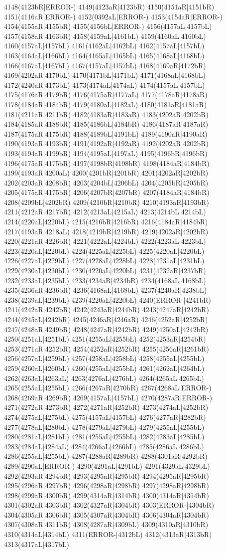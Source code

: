 4148(4123bR|ERROR-) 4149(4123aR|4123bR) 4150(4151aR|4151bR) 4151(4116aR|ERROR-) 4152(0392aL|ERROR-) 4153(4154aR|ERROR-) 4154(4155aR|4155bR) 4155(4156bL|ERROR-) 4156(4157aL|4157bL) 4157(4158aR|4163bR) 4158(4159aL|4161bL) 4159(4160aL|4160bL) 4160(4157aL|4157bL) 4161(4162aL|4162bL) 4162(4157aL|4157bL) 4163(4164aL|4166bL) 4164(4165aL|4165bL) 4165(4168aL|4168bL) 4166(4167aL|4167bL) 4167(4157aL|4157bL) 4168(4169aR|4172bR) 4169(4202aR|4170bL) 4170(4171bL|4171bL) 4171(4168aL|4168bL) 4172(4240aR|4173bL) 4173(4174aL|4174aL) 4174(4157aL|4157bL) 4175(4176aR|4179bR) 4176(4175aR|4177aL) 4177(4178aR|4178aR) 4178(4184aR|4184bR) 4179(4180aL|4182aL) 4180(4181aR|4181aR) 4181(4211aR|4211bR) 4182(4183aR|4183aR) 4183(4202aR|4202bR) 4184(4185aR|4188bR) 4185(4186bL|4184bR) 4186(4187aR|4187aR) 4187(4175aR|4175bR) 4188(4189bL|4191bL) 4189(4190aR|4190aR) 4190(4193aR|4193bR) 4191(4192aR|4192aR) 4192(4202aR|4202bR) 4193(4194aR|4199bR) 4194(4195aL|4197aL) 4195(4196bR|4196bR) 4196(4175aR|4175bR) 4197(4198bR|4198bR) 4198(4184aR|4184bR) 4199(4193aR|4200aL) 4200(4201bR|4201bR) 4201(4202aR|4202bR) 4202(4203aR|4208bR) 4203(4204bL|4206bL) 4204(4205bR|4205bR) 4205(4175aR|4175bR) 4206(4207bR|4207bR) 4207(4184aR|4184bR) 4208(4209bL|4202bR) 4209(4210bR|4210bR) 4210(4193aR|4193bR) 4211(4212aR|4217bR) 4212(4213aL|4215aL) 4213(4214bL|4214bL) 4214(4220aL|4220bL) 4215(4216bR|4216bR) 4216(4184aR|4184bR) 4217(4193aR|4218aL) 4218(4219bR|4219bR) 4219(4202aR|4202bR) 4220(4221aR|4226bR) 4221(4222aL|4224bL) 4222(4223aL|4223bL) 4223(4220aL|4220bL) 4224(4225aL|4225bL) 4225(4220aL|4220bL) 4226(4227aL|4229bL) 4227(4228aL|4228bL) 4228(4231aL|4231bL) 4229(4230aL|4230bL) 4230(4220aL|4220bL) 4231(4232aR|4237bR) 4232(4233aL|4235bL) 4233(4234aR|4234bR) 4234(4168aL|4168bL) 4235(4236aR|4236bR) 4236(4168aL|4168bL) 4237(4240aR|4238bL) 4238(4239aL|4239bL) 4239(4220aL|4220bL) 4240(ERROR-|4241bR) 4241(4242aR|4242bR) 4242(4243aR|4244bR) 4243(4247aR|4242bR) 4244(4245aL|4242bR) 4245(4246aR|4246aR) 4246(4252aR|4252bR) 4247(4248aR|4249bR) 4248(4247aR|4242bR) 4249(4250aL|4242bR) 4250(4251aL|4251bL) 4251(4255aL|4255bL) 4252(4253aR|4254bR) 4253(4271aR|4252bR) 4254(4252aR|4252bR) 4255(4256aR|4261bR) 4256(4257aL|4259bL) 4257(4258aL|4258bL) 4258(4255aL|4255bL) 4259(4260aL|4260bL) 4260(4255aL|4255bL) 4261(4262aL|4264bL) 4262(4263aL|4263aL) 4263(4276aL|4276bL) 4264(4265aL|4265bL) 4265(4255aL|4255bL) 4266(4267aR|4270bR) 4267(4268aL|ERROR-) 4268(4269aR|4269bR) 4269(4157aL|4157bL) 4270(4287aR|ERROR-) 4271(4272aR|4273bR) 4272(4271aR|4252bR) 4273(4274aL|4252bR) 4274(4275aL|4275bL) 4275(4157aL|4157bL) 4276(4277aR|4282bR) 4277(4278aL|4280bL) 4278(4279aL|4279bL) 4279(4255aL|4255bL) 4280(4281aL|4281bL) 4281(4255aL|4255bL) 4282(4283aL|4285bL) 4283(4284aL|4284aL) 4284(4266aL|4266bL) 4285(4286aL|4286bL) 4286(4255aL|4255bL) 4287(4288aR|4289bR) 4288(4301aR|4292bR) 4289(4290aL|ERROR-) 4290(4291aL|4291bL) 4291(4329aL|4329bL) 4292(4293aR|4294bR) 4293(4295aR|4295bR) 4294(4295aR|4295bR) 4295(4296aR|4297bR) 4296(4298aR|4298bR) 4297(4298aR|4298bR) 4298(4299aR|4300bR) 4299(4314aR|4314bR) 4300(4314aR|4314bR) 4301(4302aR|4303bR) 4302(4327aR|4304bR) 4303(ERROR-|4304bR) 4304(4305aR|4306bR) 4305(4307aR|4304bR) 4306(4304aR|4304bR) 4307(4308aR|4311bR) 4308(4287aR|4309bL) 4309(4310aR|4310bR) 4310(4314aL|4314bL) 4311(ERROR-|4312bL) 4312(4313aR|4313bR) 4313(4317aL|4317bL) 